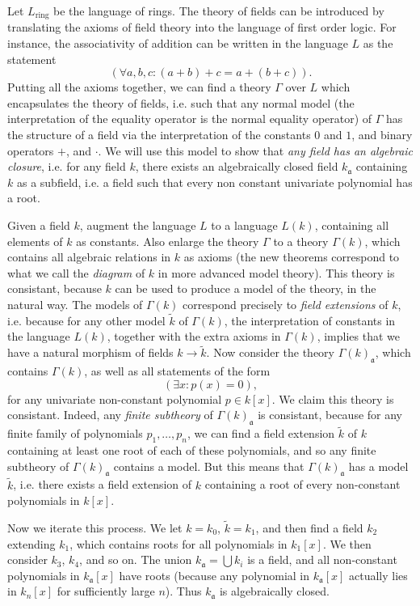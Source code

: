 \begin{example}
    Let $L_{\text{ring}}$ be the language of rings. The theory of fields can be introduced by translating the axioms of field theory into the language of first order logic. For instance, the associativity of addition can be written in the language $L$ as the statement
    \[ (\forall a,b,c: (a + b) + c = a + (b + c)). \]
    Putting all the axioms together, we can find a theory $\Gamma$ over $L$ which encapsulates the theory of fields, i.e. such that any normal model (the interpretation of the equality operator is the normal equality operator) of $\Gamma$ has the structure of a field via the interpretation of the constants $0$ and $1$, and binary operators $+$, and $\cdot$. We will use this model to show that \emph{any field has an algebraic closure}, i.e. for any field $k$, there exists an algebraically closed field $k_{\mathfrak{a}}$ containing $k$ as a subfield, i.e. a field such that every non constant univariate polynomial has a root.

    Given a field $k$, augment the language $L$ to a language $L(k)$, containing all elements of $k$ as constants. Also enlarge the theory $\Gamma$ to a theory $\Gamma(k)$, which contains all algebraic relations in $k$ as axioms (the new theorems correspond to what we call the \emph{diagram} of $k$ in more advanced model theory). This theory is consistant, because $k$ can be used to produce a model of the theory, in the natural way. The models of $\Gamma(k)$ correspond precisely to \emph{field extensions} of $k$, i.e. because for any other model $\tilde{k}$ of $\Gamma(k)$, the interpretation of constants in the language $L(k)$, together with the extra axioms in $\Gamma(k)$, implies that we have a natural morphism of fields $k \to \tilde{k}$. Now consider the theory $\Gamma(k)_{\mathfrak{a}}$, which contains $\Gamma(k)$, as well as all statements of the form
    \[ (\exists x: p(x) = 0), \]
    for any univariate non-constant polynomial $p \in k[x]$. We claim this theory is consistant. Indeed, any \emph{finite subtheory} of $\Gamma(k)_{\mathfrak{a}}$ is consistant, because for any finite family of polynomials $p_1,\dots,p_n$, we can find a field extension $\tilde{k}$ of $k$ containing at least one root of each of these polynomials, and so any finite subtheory of $\Gamma(k)_{\mathfrak{a}}$ contains a model. But this means that $\Gamma(k)_{\mathfrak{a}}$ has a model $\tilde{k}$, i.e. there exists a field extension of $k$ containing a root of every non-constant polynomials in $k[x]$.

    Now we iterate this process. We let $k = k_0$, $\tilde{k} = k_1$, and then find a field $k_2$ extending $k_1$, which contains roots for all polynomials in $k_1[x]$. We then consider $k_3$, $k_4$, and so on. The union $k_{\mathfrak{a}} = \bigcup k_i$ is a field, and all non-constant polynomials in $k_{\mathfrak{a}}[x]$ have roots (because any polynomial in $k_{\mathfrak{a}}[x]$ actually lies in $k_n[x]$ for sufficiently large $n$). Thus $k_{\mathfrak{a}}$ is algebraically closed.
\end{example}

